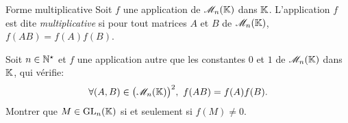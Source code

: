 \begin{defi}{Forme multiplicative}
    Soit $f$ une application de $\mathscr{M}_n(\mathbb{K})$ dans $\mathbb{K}$. L'application $f$ est dite \emph{multiplicative} si pour tout matrices $A$ et $B$ de $\mathscr{M}_n(\mathbb{K})$, $f(AB) = f(A)f(B)$.
\end{defi}

\begin{exercice}
    Soit $n \in \mathbb{N}^\star$ et $f$ une application autre que les constantes $0$ et $1$ de $\mathscr{M}_n(\mathbb{K})$ dans $\mathbb{K}$, qui vérifie:
    $$\forall (A, B) \in \big(\mathscr{M}_n(\mathbb{K})\big)^2,\ f(AB) = f(A)f(B).$$
    Montrer que $M \in \mathrm{GL}_n(\mathbb{K})$ si et seulement si $f(M) \not= 0$. 
\end{exercice}